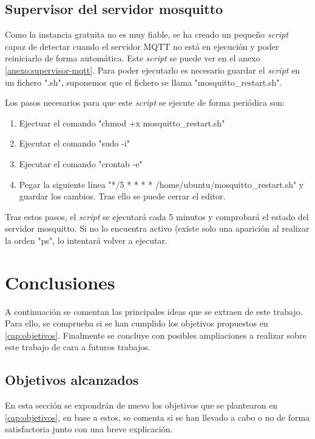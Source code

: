 \documentclass{scrbook}
\begin{document}
\section{Supervisor del servidor mosquitto}
Como la instancia gratuita no es muy fiable, se ha creado un pequeño \textit{script} capaz de detectar cuando el servidor MQTT no está en ejecución y poder reiniciarlo de forma automática. Este \textit{script} se puede ver en el anexo \ref{anexo:supervisor-mqtt}. Para poder ejecutarlo es necesario guardar el \textit{script} en un fichero ".sh", suponemos que el fichero se llama "mosquitto\_restart.sh".

Los pasos necesarios para que este \textit{script} se ejecute de forma periódica son:

\begin{enumerate}
    \item Ejectuar el comando "chmod +x mosquitto\_restart.sh"
    \item Ejecutar el comando "sudo -i"
    \item Ejecutar el comando "crontab -e"
    \item Pegar la siguiente línea "*/5 * * * * /home/ubuntu/mosquitto\_restart.sh" y guardar los cambios. Tras ello se puede cerrar el editor.
\end{enumerate}

Tras estos pasos, el \textit{script} se ejecutará cada 5 minutos y comprobará el estado del servidor mosquitto. Si no lo encuentra activo (existe solo una aparición al realizar la orden "ps", lo intentará volver a ejecutar.

\chapter{Conclusiones}
\label{cap:conclusiones}
A continuación se comentan las principales ideas que se extraen de este trabajo. Para ello, se comprueba si se han cumplido los objetivos propuestos en \ref{cap:objetivos}. Finalmente se concluye con posibles ampliaciones a realizar sobre este trabajo de cara a futuros trabajos.

\section{Objetivos alcanzados}
En esta sección se expondrán de nuevo los objetivos que se plantearon en \ref{cap:objetivos}, en base a estos, se comenta si se han llevado a cabo o no de forma satisfactoria junto con una breve explicación.
\end{document}
